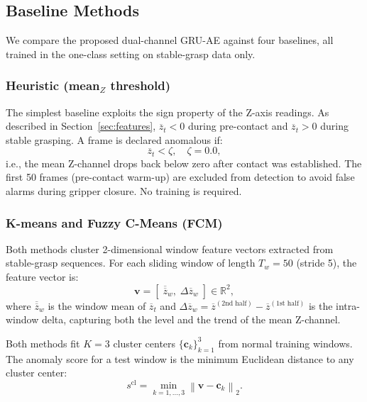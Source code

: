 \documentclass[pdflatex,sn-mathphys-num]{sn-jnl}%
\theoremstyle{thmstyleone}%
\theoremstyle{thmstyletwo}%
\theoremstyle{thmstylethree}%
\begin{document}
\subsection{Baseline Methods}
\label{sec:baselines}

We compare the proposed dual-channel GRU-AE against four baselines, all trained in the one-class setting on stable-grasp data only.

\subsubsection{Heuristic (mean$_Z$ threshold)}
\label{sec:heuristic}

The simplest baseline exploits the sign property of the Z-axis readings. As described in Section~\ref{sec:features}, $\overline{z}_t < 0$ during pre-contact and $\overline{z}_t > 0$ during stable grasping. A frame is declared anomalous if:
\begin{equation}
    \overline{z}_t < \zeta, \quad \zeta = 0.0,
    \label{eq:heuristic}
\end{equation}
i.e., the mean Z-channel drops back below zero after contact was established. The first 50 frames (pre-contact warm-up) are excluded from detection to avoid false alarms during gripper closure. No training is required.

\subsubsection{K-means and Fuzzy C-Means (FCM)}
\label{sec:kmeans_fcm}

Both methods cluster 2-dimensional window feature vectors extracted from stable-grasp sequences. For each sliding window of length $T_w = 50$ (stride 5), the feature vector is:
\begin{equation}
    \mathbf{v} = \left[\;\overline{\overline{z}}_w,\; \Delta\overline{z}_w\;\right] \in \mathbb{R}^2,
    \label{eq:win_feat}
\end{equation}
where $\overline{\overline{z}}_w$ is the window mean of $\overline{z}_t$ and $\Delta\overline{z}_w = \overline{z}^{(\text{2nd half})} - \overline{z}^{(\text{1st half})}$ is the intra-window delta, capturing both the level and the trend of the mean Z-channel.

Both methods fit $K = 3$ cluster centers $\{\mathbf{c}_k\}_{k=1}^3$ from normal training windows. The anomaly score for a test window is the minimum Euclidean distance to any cluster center:
\begin{equation}
    s^{\mathrm{cl}} = \min_{k=1,\ldots,3} \left\|\mathbf{v} - \mathbf{c}_k\right\|_2.
    \label{eq:cluster_score}
\end{equation}
\end{document}
